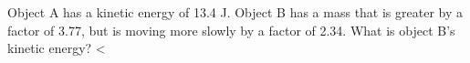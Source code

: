         Object A has a kinetic energy of 13.4 J. Object B has a
        mass that is greater by a factor of 3.77, but is moving more
        slowly by a factor of 2.34. What is object B's kinetic
        energy?
        <%

